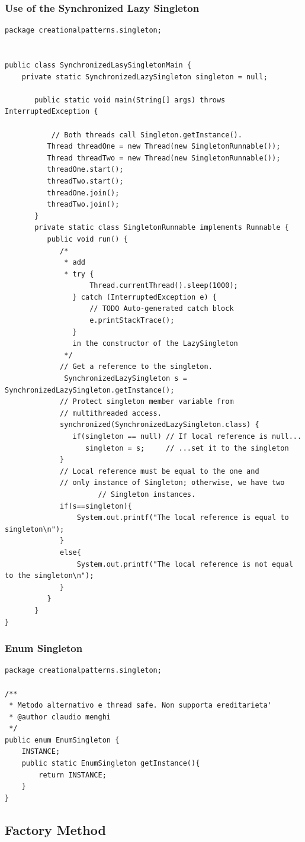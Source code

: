 \documentclass{article}
\begin{document}
\subsubsection{Use of the Synchronized Lazy Singleton}
\begin{lstlisting}
package creationalpatterns.singleton;


public class SynchronizedLasySingletonMain {
	private static SynchronizedLazySingleton singleton = null;
	
	   public static void main(String[] args) throws InterruptedException {
			
		   // Both threads call Singleton.getInstance().
	      Thread threadOne = new Thread(new SingletonRunnable());
	      Thread threadTwo = new Thread(new SingletonRunnable());
	      threadOne.start();
	      threadTwo.start();
	      threadOne.join();
	      threadTwo.join();
	   }
	   private static class SingletonRunnable implements Runnable {
	      public void run() {
	    	 /*
	    	  * add 
	    	  * try {
					Thread.currentThread().sleep(1000);
				} catch (InterruptedException e) {
					// TODO Auto-generated catch block
					e.printStackTrace();
				}
				in the constructor of the LazySingleton 
	    	  */
	         // Get a reference to the singleton.
	    	  SynchronizedLazySingleton s = SynchronizedLazySingleton.getInstance();
	         // Protect singleton member variable from
	         // multithreaded access.
	         synchronized(SynchronizedLazySingleton.class) {
	            if(singleton == null) // If local reference is null...
	               singleton = s;     // ...set it to the singleton
	         }
	         // Local reference must be equal to the one and
	         // only instance of Singleton; otherwise, we have two
	                  // Singleton instances.
	         if(s==singleton){
	        	 System.out.printf("The local reference is equal to singleton\n");
	         }
	         else{
	        	 System.out.printf("The local reference is not equal to the singleton\n");
	         }
	      }
	   }
}
\end{lstlisting}


\subsubsection{Enum Singleton}

\begin{lstlisting}
package creationalpatterns.singleton;

/**
 * Metodo alternativo e thread safe. Non supporta ereditarieta'
 * @author claudio menghi
 */
public enum EnumSingleton {
	INSTANCE;
	public static EnumSingleton getInstance(){
		return INSTANCE;
	}
}
\end{lstlisting}


\subsection{Factory Method}

\clearpage






\nocite{*}
\end{document}
